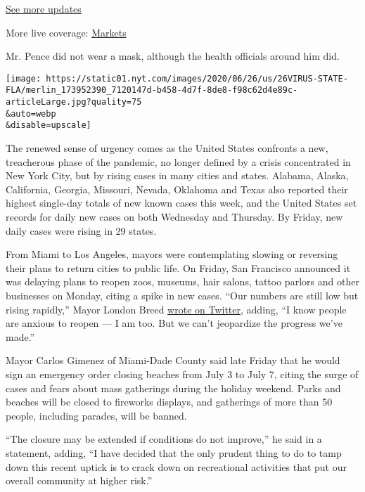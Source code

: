\href{https://www.nytimes.com/2020/08/01/world/coronavirus-covid-19.html?action=click\&pgtype=Article\&state=default\&region=MAIN_CONTENT_1\&context=storylines_live_updates}{See
more updates}

More live coverage:
\href{https://www.nytimes.com/live/2020/07/31/business/stock-market-today-coronavirus?action=click\&pgtype=Article\&state=default\&region=MAIN_CONTENT_1\&context=storylines_live_updates}{Markets}

Mr. Pence did not wear a mask, although the health officials around him
did.

\texttt{[image: https://static01.nyt.com/images/2020/06/26/us/26VIRUS-STATE-FLA/merlin\_173952390\_7120147d-b458-4d7f-8de8-f98c62d4e89c-articleLarge.jpg?quality=75\\\&auto=webp\\\&disable=upscale]}

The renewed sense of urgency comes as the United States confronts a new,
treacherous phase of the pandemic, no longer defined by a crisis
concentrated in New York City, but by rising cases in many cities and
states. Alabama, Alaska, California, Georgia, Missouri, Nevada, Oklahoma
and Texas also reported their highest single-day totals of new known
cases this week, and the United States set records for daily new cases
on both Wednesday and Thursday. By Friday, new daily cases were rising
in 29 states.

From Miami to Los Angeles, mayors were contemplating slowing or
reversing their plans to return cities to public life. On Friday, San
Francisco announced it was delaying plans to reopen zoos, museums, hair
salons, tattoo parlors and other businesses on Monday, citing a spike in
new cases. ``Our numbers are still low but rising rapidly,'' Mayor
London Breed
\href{https://twitter.com/LondonBreed/status/1276596917770715136}{wrote
on Twitter}, adding, ``I know people are anxious to reopen --- I am too.
But we can't jeopardize the progress we've made.''

Mayor Carlos Gimenez of Miami-Dade County said late Friday that he would
sign an emergency order closing beaches from July 3 to July 7, citing
the surge of cases and fears about mass gatherings during the holiday
weekend. Parks and beaches will be closed to fireworks displays, and
gatherings of more than 50 people, including parades, will be banned.

``The closure may be extended if conditions do not improve,'' he said in
a statement, adding, ``I have decided that the only prudent thing to do
to tamp down this recent uptick is to crack down on recreational
activities that put our overall community at higher risk.''

